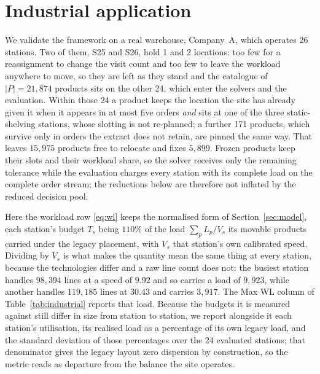 \documentclass[]{interact}
\begin{document}
\section{Industrial application}\label{sec:industrial}
We validate the framework on a real warehouse, Company~A, which operates 26 stations. Two of them, S25 and S26, hold 1 and 2 locations: too few for a reassignment to change the visit count and too few to leave the workload anywhere to move, so they are left as they stand and the catalogue of $|P| = 21{,}874$ products sits on the other 24, which enter the solvers and the evaluation. Within those 24 a product keeps the location the site has already given it when it appears in at most five orders \emph{and} sits at one of the three static-shelving stations, whose slotting is not re-planned; a further 171 products, which survive only in orders the extract does not retain, are pinned the same way. That leaves $15{,}975$ products free to relocate and fixes $5{,}899$. Frozen products keep their slots and their workload share, so the solver receives only the remaining tolerance while the evaluation charges every station with its complete load on the complete order stream; the reductions below are therefore not inflated by the reduced decision pool.

Here the workload row \eqref{eq:wl} keeps the normalised form of Section~\ref{sec:model}, each station's budget $T_s$ being $110\%$ of the load $\sum_{p} L_p/V_s$ its movable products carried under the legacy placement, with $V_s$ that station's own calibrated speed. Dividing by $V_s$ is what makes the quantity mean the same thing at every station, because the technologies differ and a raw line count does not: the busiest station handles $98{,}394$ lines at a speed of $9.92$ and so carries a load of $9{,}923$, while another handles $119{,}185$ lines at $30.43$ and carries $3{,}917$. The Max WL column of Table~\ref{tab:industrial} reports that load. Because the budgets it is measured against still differ in size from station to station, we report alongside it each station's utilisation, its realised load as a percentage of its own legacy load, and the standard deviation of those percentages over the 24 evaluated stations; that denominator gives the legacy layout zero dispersion by construction, so the metric reads as departure from the balance the site operates.
\end{document}
